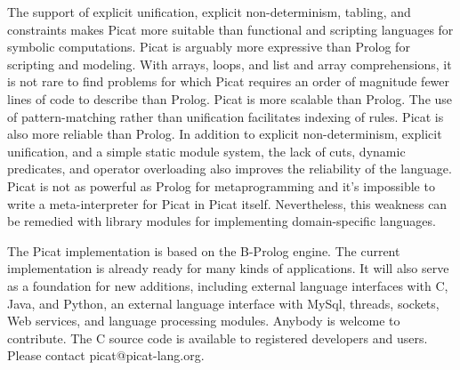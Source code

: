 The support of explicit unification, explicit non-determinism, tabling, and constraints makes Picat more suitable than functional and scripting languages for symbolic computations. Picat is arguably more expressive than Prolog for scripting and modeling. With arrays, loops, and list and array comprehensions, it is not rare to find problems for which Picat requires an order of magnitude fewer lines of code to describe than Prolog. Picat is more scalable than Prolog. The use of pattern-matching rather than unification facilitates indexing of rules. Picat is also more reliable than Prolog. In addition to explicit non-determinism, explicit unification, and a simple static module system, the lack of cuts, dynamic predicates, and operator overloading also improves the reliability of the language. Picat is not as powerful as Prolog for metaprogramming and it's impossible to write a meta-interpreter for Picat in Picat itself. Nevertheless, this weakness can be remedied with library modules for implementing domain-specific languages.

The Picat implementation is based on the B-Prolog engine. The current implementation is already ready for many kinds of applications. It will also serve as a foundation for new additions, including external language interfaces with C, Java, and Python, an external language interface with MySql, threads, sockets, Web services, and language processing modules. Anybody is welcome to contribute. The C source code is available to registered developers and users. Please contact picat@picat-lang.org.
